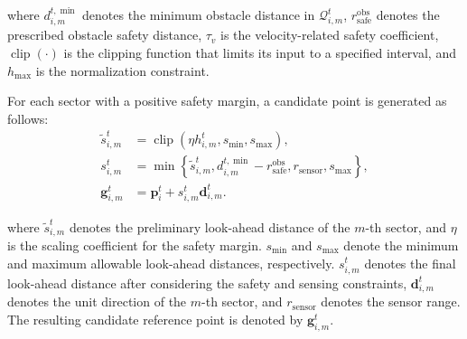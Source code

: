 \noindent
where $d_{i,m}^{t,\min}$ denotes the minimum obstacle distance in $\mathcal{Q}_{i,m}^t$, $r_{\mathrm{safe}}^{\mathrm{obs}}$ denotes the prescribed obstacle safety distance, $\tau_v$ is the velocity-related safety coefficient, $\operatorname{clip}(\cdot)$ is the clipping function that limits its input to a specified interval, and $h_{\max}$ is the normalization constraint.

For each sector with a positive safety margin, a candidate point is generated as follows:
\begin{equation}
    \label{eq:sector_step_length}
    \begin{aligned}
        \tilde{s}_{i,m}^t
        &= \operatorname{clip}
        \left(
        \eta h_{i,m}^t,
        s_{\min},
        s_{\max}
        \right), \\
        s_{i,m}^t
        &= \min
        \left\{
        \tilde{s}_{i,m}^t,
        d_{i,m}^{t,\min}-r_{\mathrm{safe}}^{\mathrm{obs}},
        r_{\mathrm{sensor}},
        s_{\max}
        \right\}, \\
        \mathbf{g}_{i,m}^t
        &= \mathbf{p}_i^t
        + s_{i,m}^t\mathbf{d}_{i,m}^t .
    \end{aligned}
\end{equation}

\noindent
where $\tilde{s}_{i,m}^t$ denotes the preliminary look-ahead distance of the $m$-th sector, and $\eta$ is the scaling coefficient for the safety margin. $s_{\min}$ and $s_{\max}$ denote the minimum and maximum allowable look-ahead distances, respectively. $s_{i,m}^t$ denotes the final look-ahead distance after considering the safety and sensing constraints, $\mathbf d_{i,m}^t$ denotes the unit direction of the $m$-th sector, and $r_{\mathrm{sensor}}$ denotes the sensor range. The resulting candidate reference point is denoted by $\mathbf{g}_{i,m}^t$.




